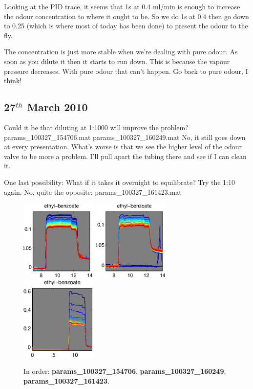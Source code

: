 \documentclass[a4paper]{report}
\begin{document}
Looking at the PID trace, it seems that 1s at 0.4 ml/min is enough to
increase the odour concentration to where it ought to be. So we do 1s
at 0.4 then go down to 0.25 (which is where most of today has been
done) to present the odour to the fly. 

The concentration is just more stable when we're dealing with pure
odour. As soon as you dilute it then it starts to run down. This is
because the vapour pressure decreases. With pure odour that can't
happen. Go back to pure odour, I think!





\clearpage
\subsection{27$^{th}$ March 2010}
Could it be that diluting at 1:1000 will improve the problem?
params\_100327\_154706.mat
params\_100327\_160249.mat
No, it still goes down at every presentation. What's worse is that we see the
higher level of the odour valve to be more a problem. I'll pull apart
the tubing there and see if I can clean it. 

One last possibility: What if it takes it overnight to equilibrate?
Try the 1:10 again. No, quite the opposite: params\_100327\_161423.mat
\begin{figure}[h]
\centering
\includegraphics[width=1.5in]{params_100327_154706.eps}
\includegraphics[width=1.5in]{params_100327_160249.eps}
\includegraphics[width=1.5in]{params_100327_161423.eps}
\caption{In order: \textbf{params\_100327\_154706},
  \textbf{params\_100327\_160249}, \textbf{params\_100327\_161423}.}
\end{figure}
\end{document}
